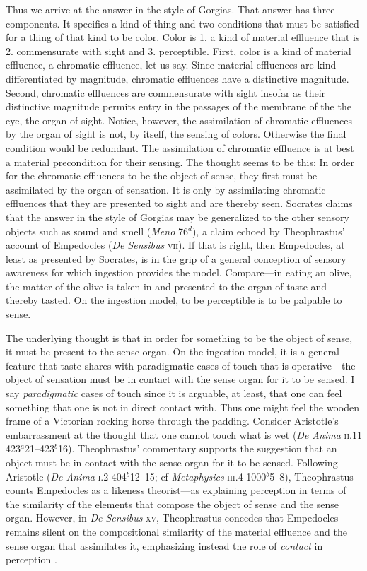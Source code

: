 \documentclass[12pt]{article}
\begin{document}
Thus we arrive at the answer in the style of Gorgias. That answer has three components. It specifies a kind of thing and two conditions that must be satisfied for a thing of that kind to be color. Color is 1. a kind of material effluence that is 2. commensurate with sight and 3. perceptible. First, color is a kind of material effluence, a chromatic effluence, let us say. Since material effluences are kind differentiated by magnitude, chromatic effluences have a distinctive magnitude. Second, chromatic effluences are commensurate with sight insofar as their distinctive magnitude permits entry in the passages of the membrane of the the eye, the organ of sight. Notice, however, the assimilation of chromatic effluences by the organ of sight is not, by itself, the sensing of colors. Otherwise the final condition would be redundant. The assimilation of chromatic effluence is at best a material precondition for their sensing. The thought seems to be this: In order for the chromatic effluences to be the object of sense, they first must be assimilated by the organ of sensation. It is only by assimilating chromatic effluences that they are presented to sight and are thereby seen. Socrates claims that the answer in the style of Gorgias may be generalized to the other sensory objects such as sound and smell (\emph{Meno} 76\( ^{d} \)), a claim echoed by Theophrastus' account of Empedocles (\emph{De Sensibus} \textsc{vii}). If that is right, then Empedocles, at least as presented by Socrates, is in the grip of a general conception of sensory awareness for which ingestion provides the model. Compare---in eating an olive, the matter of the olive is taken in and presented to the organ of taste and thereby tasted. On the ingestion model, to be perceptible is to be palpable to sense. 

The underlying thought is that in order for something to be the object of sense, it must be present to the sense organ. On the ingestion model, it is a general feature that taste shares with paradigmatic cases of touch that is operative---the object of sensation must be in contact with the sense organ for it to be sensed. I say \emph{paradigmatic} cases of touch since it is arguable, at least, that one can feel something that one is not in direct contact with. Thus one might feel the wooden frame of a Victorian rocking horse through the padding. Consider Aristotle's embarrassment at the thought that one cannot touch what is wet (\emph{De Anima} \textsc{ii}.11 423\( ^{a} \)21--423\( ^{b} \)16). Theophrastus' commentary supports the suggestion that an object must be in contact with the sense organ for it to be sensed. Following Aristotle (\emph{De Anima} \textsc{i}.2 404\( ^{b} \)12--15; cf \emph{Metaphysics} \textsc{iii}.4 1000\( ^{b} \)5--8), Theophrastus counts Empedocles as a likeness theorist---as explaining perception in terms of the similarity of the elements that compose the object of sense and the sense organ. However, in \emph{De Sensibus} \textsc{xv}, Theophrastus concedes that Empedocles remains silent on the compositional similarity of the material effluence and the sense organ that assimilates it, emphasizing instead the role of \emph{contact} in perception \citep{Kamtekar:2009fk,Sedley:1992uq}.
\end{document}
